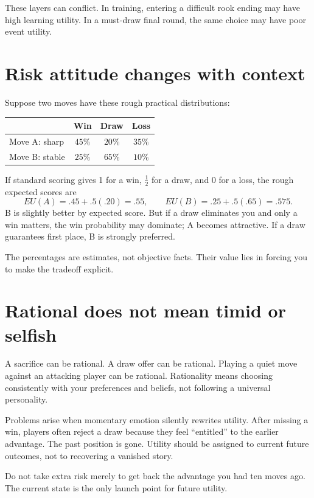 These layers can conflict. In training, entering a difficult rook ending may have high learning utility. In a must-draw final round, the same choice may have poor event utility.

\section{Risk attitude changes with context}
Suppose two moves have these rough practical distributions:

\begin{center}
\begin{tabular}{lccc}
\toprule
& Win & Draw & Loss\\
\midrule
Move A: sharp & $45\%$ & $20\%$ & $35\%$\\
Move B: stable & $25\%$ & $65\%$ & $10\%$\\
\bottomrule
\end{tabular}
\end{center}

If standard scoring gives 1 for a win, $\tfrac12$ for a draw, and 0 for a loss, the rough expected scores are
\[
EU(A)=.45+.5(.20)=.55,
\qquad
EU(B)=.25+.5(.65)=.575.
\]
B is slightly better by expected score. But if a draw eliminates you and only a win matters, the win probability may dominate; A becomes attractive. If a draw guarantees first place, B is strongly preferred.

The percentages are estimates, not objective facts. Their value lies in forcing you to make the tradeoff explicit.

\section{Rational does not mean timid or selfish}
A sacrifice can be rational. A draw offer can be rational. Playing a quiet move against an attacking player can be rational. Rationality means choosing consistently with your preferences and beliefs, not following a universal personality.

Problems arise when momentary emotion silently rewrites utility. After missing a win, players often reject a draw because they feel ``entitled'' to the earlier advantage. The past position is gone. Utility should be assigned to current future outcomes, not to recovering a vanished story.

\begin{warningbox}[title={Sunk-position fallacy}]
Do not take extra risk merely to get back the advantage you had ten moves ago. The current state is the only launch point for future utility.
\end{warningbox}

